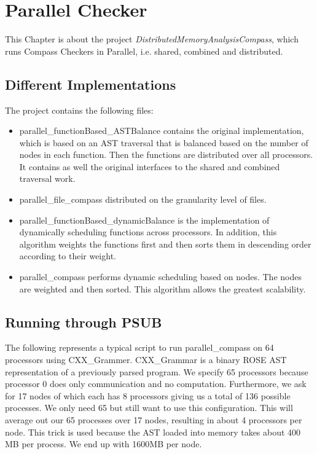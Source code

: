 \chapter{Parallel Checker}

This Chapter is about the project \emph{DistributedMemoryAnalysisCompass}, which
runs Compass Checkers in Parallel, i.e. shared, combined and distributed.

\section{Different Implementations}

The project contains the following files:

\begin{itemize}
\item parallel\_functionBased\_ASTBalance contains the original implementation, which is based on an AST traversal
      that is balanced based on the number of nodes in each function. Then the functions are distributed over all
      processors. It contains as well the original interfaces to the shared and combined traversal work.
\item parallel\_file\_compass distributed on the granularity level of files. 
\item parallel\_functionBased\_dynamicBalance is the implementation of dynamically scheduling functions across
      processors. In addition, this algorithm weights the functions first and then sorts them in descending order
      according to their weight.
\item parallel\_compass performs dynamic scheduling based on nodes. The nodes are weighted and then sorted.
      This algorithm allows the greatest scalability.
\end{itemize}


\section{Running through PSUB}

The following represents a typical script to run parallel\_compass on 64 processors using CXX\_Grammer.
CXX\_Grammar is a binary ROSE AST representation of a previously parsed program. We specify 65 processors
because processor 0 does only communication and no computation. Furthermore, we ask for 17 nodes of which each has 8 
processors giving us a total of 136 possible processes. We only need 65 but still want to use this configuration.
This will average out our 65 processes over 17 nodes, resulting in about 4 processors per node.
This trick is used because the AST loaded into memory takes about 400 MB per process. We end up with 1600MB per node.


